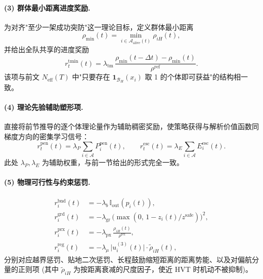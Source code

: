 \paragraph{(3) 群体最小距离进度奖励.}
为对齐"至少一架成功突防"这一理论目标，定义群体最小距离
\begin{equation}
\rho_{\min}(t)=\min_{i\in\mathcal{A}_{\mathrm{alive}}(t)}\rho_{iH}(t),
\end{equation}
并给出全队共享的进度奖励
\begin{equation}
r_t^{\mathrm{tmin}}(t)=\lambda_{\mathrm{tm}}\,\frac{\rho_{\min}(t-\Delta t)-\rho_{\min}(t)}{\rho^{\mathrm{ref}}}.
\label{eq:r-team}
\end{equation}
该项与前文 $N_{\mathrm{eff}}(T)$ 中"只要存在 $\mathbf{1}_{\mathcal B_H}(x_i)$ 取 1 的个体即可获益"的结构相一致。

\paragraph{(4) 理论先验辅助塑形项.}
直接将前节推导的逐个体理论量作为辅助稠密奖励，使策略获得与解析价值函数同梯度方向的密集学习信号：
\begin{equation}
r_t^{\mathrm{pen}}(t)=\lambda_P\sum_{i\in\mathcal{A}}P_i^{\mathrm{pen}}(t),\qquad
r_t^{\mathrm{esc}}(t)=\lambda_E\sum_{i\in\mathcal{A}}E_i^{\mathrm{esc}}(t).
\label{eq:r-prior}
\end{equation}
此处 $\lambda_P,\lambda_E$ 为辅助权重，与前一节给出的形式完全一致。

\paragraph{(5) 物理可行性与约束惩罚.}
\begin{align}
r_i^{\mathrm{bnd}}(t)&=-\lambda_b\,\mathbb{I}_{\mathrm{out}}(p_i(t)),
\label{eq:r-bnd}\\
r_i^{\mathrm{grd}}(t)&=-\lambda_{\mathrm{gr}}\,\bigl(\max(0,\,1-z_i(t)/z^{\mathrm{safe}})\bigr)^{2},
\label{eq:r-grd}\\
r_i^{\mathrm{prx}}(t)&=-\lambda_{\mathrm{px}}\,\frac{\rho_{iH}(t)}{\rho^{\mathrm{ref}}},
\label{eq:r-prx}\\
r_i^{\mathrm{reg}}(t)&=-\lambda_{\mu}\,\bigl|u_i^{(3)}(t)\bigr|\cdot \tilde\rho_{iH}(t),
\label{eq:r-reg}
\end{align}
分别对应越界惩罚、贴地二次惩罚、长程鼓励缩短距离的距离势能、以及对偏航分量的正则项 (其中 $\tilde\rho_{iH}$ 为按距离衰减的尺度因子，使近 HVT 时机动不被抑制)。

